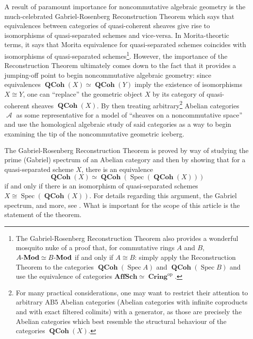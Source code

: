 \documentclass{amsart}
\theoremstyle{definition}
\DeclareMathOperator{\Ascr}{\mathscr{A}}
\DeclareMathOperator{\Cring}{\mathbf{Cring}}
\DeclareMathOperator{\op}{op}
\DeclareMathOperator{\Spec}{Spec}
\DeclareMathOperator{\QCoh}{\mathbf{QCoh}}
\newcommand{\Mod}[1]{{#1}\textnormal{-}\mathbf{Mod}}
\numberwithin{equation}{subsection}
\begin{document}
A result of paramount importance for noncommutative algebraic geometry is the much-celebrated Gabriel-Rosenberg Reconstruction Theorem which says that equivalences between categories of quasi-coherent sheaves give rise to isomorphisms of quasi-separated schemes and vice-versa. In Morita-theortic terms, it says that Morita equivalence for quasi-separated schemes coincides with isomorphisms of quasi-separated schemes\footnote{The Gabriel-Rosenberg Reconstruction Theorem also provides a wonderful mosquito nuke of a proof that, for commutative rings $A$ and $B$, $\Mod{A} \simeq \Mod{B}$ if and only if $A \cong B$: simply apply the Reconstruction Theorem to the categories $\QCoh(\Spec A)$ and $\QCoh(\Spec B)$ and use the equivalence of categories $\mathbf{AffSch} \simeq \Cring^{\op}$.}. However, the importance of the Reconstruction Theorem ultimately comes down to the fact that it provides a jumping-off point to begin noncommutative algebraic geometry: since equivalences $\QCoh(X) \simeq \QCoh(Y)$ imply the existence of isomorphisms $X \cong Y$, one can ``replace'' the geometric object $X$ by its category of quasi-coherent sheaves $\QCoh(X)$. By then treating arbitrary\footnote{For many practical considerations, one may want to restrict their attention to  arbitrary AB5 Abelian categories (Abelian categories with infinite coproducts and with exact filtered colimits) with a generator, as those are precisely the Abelian categories which best resemble the structural behaviour of the categories $\QCoh(X)$.} Abelian categories $\Ascr$ as some representative for a model of ``sheaves on a noncommutative space'' and use the homological algebraic study of said categories as a way to begin examining the tip of the noncommutative geometric iceberg.

The Gabriel-Rosenberg Reconstruction Theorem is proved by way of studying the prime (Gabriel) spectrum of an Abelian category and then by showing that for a quasi-separated scheme $X$, there is an equivalence
\[
\QCoh(X) \simeq \QCoh(\Spec(\QCoh(X)))
\]
if and only if there is an isomorphism of quasi-separated schemes $X \cong \Spec(\QCoh(X))$. For details regarding this argument, the Gabriel spectrum, and more, see \cite{BrandenbergReconstruction}. What is important for the scope of this article is the statement of the theorem.
\end{document}

